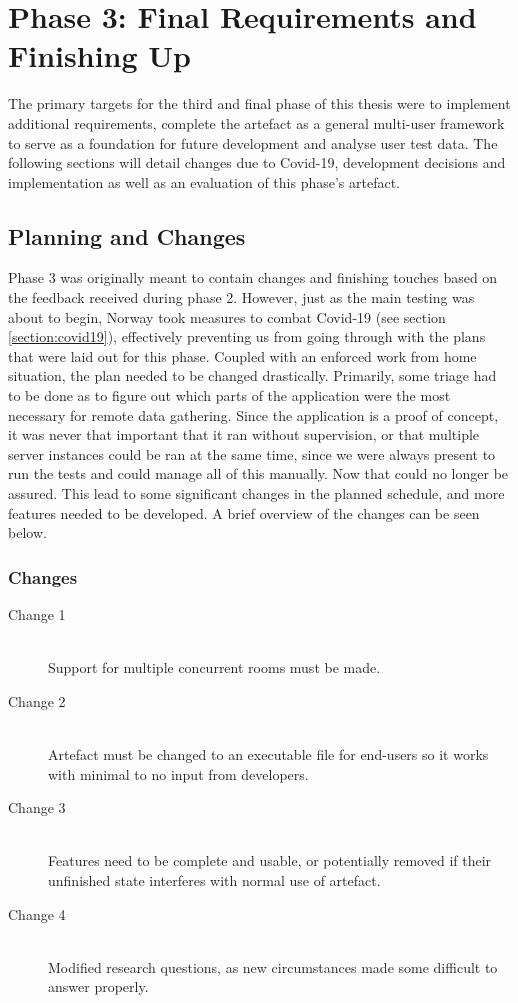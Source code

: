 
\chapter{Phase 3: Final Requirements and Finishing Up} 
\label{chap:7}
\label{chap:phase3}
The primary targets for the third and final phase of this thesis were to implement additional requirements, complete the artefact as a general multi-user framework to serve as a foundation for future development and analyse user test data. The following sections will detail changes due to Covid-19, development decisions and implementation as well as an evaluation of this phase's artefact.                 


\section{Planning and Changes}
Phase 3 was originally meant to contain changes and finishing touches based on the feedback received during phase 2. However, just as the main testing was about to begin, Norway took measures to combat Covid-19 (see section \ref{section:covid19}), effectively preventing us from going through with the plans that were laid out for this phase. Coupled with an enforced work from home situation, the plan needed to be changed drastically. Primarily, some triage had to be done as to figure out which parts of the application were the most necessary for remote data gathering. Since the application is a proof of concept, it was never that important that it ran without supervision, or that multiple server instances could be ran at the same time, since we were always present to run the tests and could manage all of this manually. Now that could no longer be assured. This lead to some significant changes in the planned schedule, and more features needed to be developed. A brief overview of the changes can be seen below.

\subsection{Changes}
\begin{description}
    \item [Change 1]\hfill \\
    Support for multiple concurrent rooms must be made. 
    \item [Change 2]\hfill \\
    Artefact must be changed to an executable file for end-users so it works with minimal to no input from developers.
    \item [Change 3]\hfill \\
    Features need to be complete and usable, or potentially removed if their unfinished state interferes with normal use of artefact.
    \item[Change 4]\hfill \\
    Modified research questions, as new circumstances made some difficult to answer properly.
\end{description}

